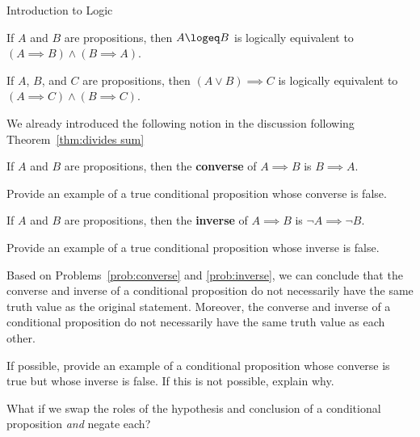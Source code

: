 \begin{section}{Introduction to Logic}
\begin{theorem}\label{thm:logical form for iff}
If $A$ and $B$ are propositions, then $A\logeq B$ is logically equivalent to $(A\implies B)\wedge (B\implies A)$.
\end{theorem}

\begin{theorem}\label{thm:logical form for cases}
If $A$, $B$, and $C$ are propositions, then $(A\vee B)\implies C$ is logically equivalent to $(A\implies C)\wedge (B\implies C)$.
\end{theorem}

We already introduced the following notion in the discussion following Theorem~\ref{thm:divides sum}

\begin{definition}\label{def:converse}
If $A$ and $B$ are propositions, then the \textbf{converse} of $A \implies B$ is $B \implies A$.
\end{definition}

\begin{problem}\label{prob:converse}
Provide an example of a true conditional proposition whose converse is false.
\end{problem}

\begin{definition}\label{def:inverse}
If $A$ and $B$ are propositions, then the \textbf{inverse} of $A \implies B$ is $\neg A \implies \neg B$.
\end{definition}

\begin{problem}\label{prob:inverse}
Provide an example of a true conditional proposition whose inverse is false.
\end{problem}

Based on Problems~\ref{prob:converse} and \ref{prob:inverse}, we can conclude that the converse and inverse of a conditional proposition do not necessarily have the same truth value as the original statement.  Moreover, the converse and inverse of a conditional proposition do not necessarily have the same truth value as each other.

\begin{problem}\label{prob:converse and inverse}
If possible, provide an example of a conditional proposition whose converse is true but whose inverse is false. If this is not possible, explain why.
\end{problem}

What if we swap the roles of the hypothesis and conclusion of a conditional proposition \emph{and} negate each?


\end{section}
